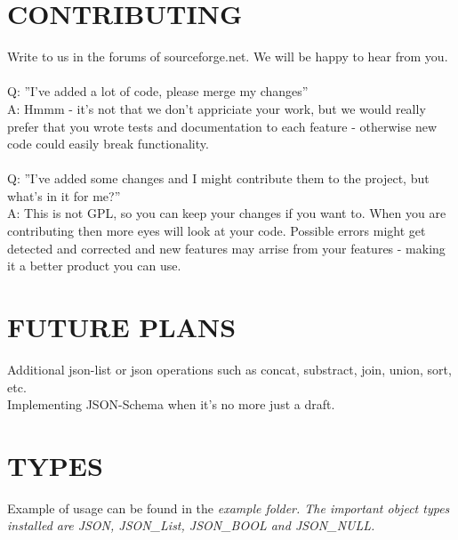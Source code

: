 \documentclass[11pt,twocolumn, a4paper]{article}
\begin{document}
\section*{CONTRIBUTING}
Write to us in the forums of sourceforge.net. We will be happy to hear from you. \\\\
Q: ''I've added a lot of code, please merge my changes''\\
A: Hmmm - it's not that we don't appriciate your work, but we would really prefer that you wrote tests and documentation to each feature - otherwise new code could easily break functionality. \\\\
Q: ''I've added some changes and I might contribute them to the project, but what's in it for me?''\\
A: This is not GPL, so you can keep your changes if you want to. 
When you are contributing then more eyes will look at your code. 
Possible errors might get detected and corrected and new features may arrise from your features - making it a better product you can use.

\section*{FUTURE PLANS}
Additional json-list or json operations such as concat, substract, join, union, sort, etc.\\
Implementing JSON-Schema when it's no more just a draft.

\onecolumn
\section*{TYPES}
Example of usage can be found in the \em example \em folder. The important object types installed are JSON, JSON\_List, JSON\_BOOL and JSON\_NULL.
\end{document}
